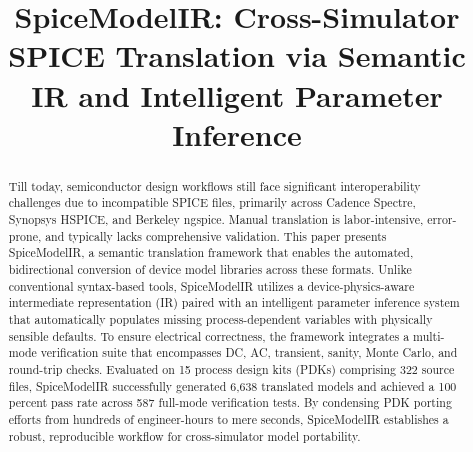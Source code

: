 \documentclass[conference]{IEEEtran}
\begin{document}
\graphicspath{{./figures/}{./biography/}{./}}

\title{SpiceModelIR: Cross-Simulator SPICE Translation via Semantic IR and Intelligent Parameter Inference}


\maketitle

\begin{abstract}
Till today, semiconductor design workflows still face significant interoperability challenges due to incompatible SPICE files, primarily across Cadence Spectre, Synopsys HSPICE, and Berkeley ngspice. Manual translation is labor-intensive, error-prone, and typically lacks comprehensive validation. This paper presents SpiceModelIR, a semantic translation framework that enables the automated, bidirectional conversion of device model libraries across these formats. Unlike conventional syntax-based tools, SpiceModelIR utilizes a device-physics-aware intermediate representation (IR) paired with an intelligent parameter inference system that automatically populates missing process-dependent variables with physically sensible defaults. To ensure electrical correctness, the framework integrates a multi-mode verification suite that encompasses DC, AC, transient, sanity, Monte Carlo, and round-trip checks. Evaluated on 15 process design kits (PDKs) comprising 322 source files, SpiceModelIR successfully generated 6,638 translated models and achieved a 100 percent pass rate across 587 full-mode verification tests. By condensing PDK porting efforts from hundreds of engineer-hours to mere seconds, SpiceModelIR establishes a robust, reproducible workflow for cross-simulator model portability.
\end{abstract}
\end{document}
